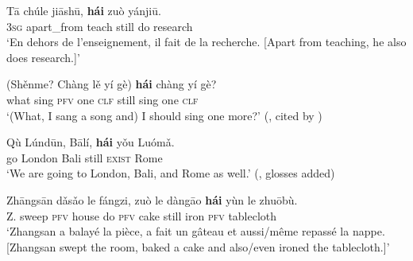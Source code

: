 \begin{exe}

	\ex
	\gll Tā	chúle	jiāshū,		\textbf{hái}	zuò	yánjiū.\\
	3\textsc{sg} apart\_from teach still do research\\
	\glt \lq En dehors de l'enseignement, il fait de la recherche. [Apart from teaching, he also does research.]\rq{ }\parencite[273]{Paris1988}
	
		\ex
	\gll (Shěnme?	Chàng lě	yí	gè) \textbf{hái} chàng		yí	gè?\\
	\phantom{(}what sing \textsc{pfv} one \textsc{clf} still sing one \textsc{clf}\\
	\glt \lq (What, I sang a song and) I should sing one more?' (\cite[127]{Shen2006}, cited by \cite[56]{JingSchmidtGries2009})
	
	\ex\label{exAppendixMandarinHaiYou}
	\gll Qù Lúndūn, Bālí, \textbf{hái} yǒu Luómǎ.\\
	go London Bali still \textsc{exist} Rome\\
	\glt \lq We are going to London, Bali, and Rome as well.' (\cite[312]{Wiedenhof2015}, glosses added)
	
	\ex\label{exAppendixMandarinAdditive4}
	\gll Zhāngsān dǎsǎo le fángzi, zuò le dàngāo \textbf{hái} yùn le zhuōbù.\\
	Z. sweep \textsc{pfv} house do \textsc{pfv} cake still iron \textsc{pfv} tablecloth\\
	\glt \lq Zhangsan a balayé la pièce, a fait un gâteau et aussi/même repassé la nappe. [Zhangsan swept the room, baked a cake and also/even ironed the tablecloth.]\rq{ }\parencite[113]{Donazzan2008}
\end{exe}

